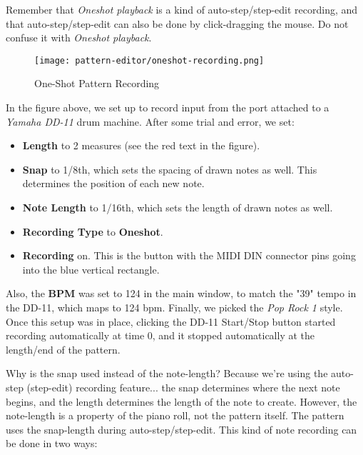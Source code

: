    Remember that \textsl{Oneshot playback} is a kind of auto-step/step-edit
   recording, and that auto-step/step-edit can also be done by click-dragging
   the mouse.  Do not confuse it with \textsl{Oneshot playback}.

\begin{figure}[H]
   \centering 
   \texttt{[image: pattern-editor/oneshot-recording.png]}
   \caption{One-Shot Pattern Recording}
   \label{fig:pattern_editor_oneshot_recording}
\end{figure}

   In the figure above, we set up to record input from the port attached to a
   \textsl{Yamaha DD-11} drum machine.  After some trial and error,
   we set:

   \begin{itemize}
      \item \textbf{Length} to 2 measures (see the red text in the figure).
      \item \textbf{Snap} to 1/8th, which sets the spacing of drawn notes as
         well.  This determines the position of each new note.
      \item \textbf{Note Length} to 1/16th, which sets the length of drawn
         notes as well.
      \item \textbf{Recording Type} to \textbf{Oneshot}.
      \item \textbf{Recording} on. This is the button with the MIDI DIN
         connector pins going into the blue vertical rectangle.
   \end{itemize}

   Also, the \textbf{BPM} was set to 124 in the main
   window, to match the "39" tempo in the DD-11, which maps to 124 bpm.
   Finally, we picked the \textsl{Pop Rock 1} style.  
   Once this setup was in place, clicking the DD-11 Start/Stop button started
   recording automatically at time 0, and it stopped automatically at the
   length/end of the pattern.

   Why is the snap used instead of the note-length?  Because we're using the
   auto-step (step-edit) recording feature...
   the snap determines where the next note
   begins, and the length determines the length of the note to create.
   However, the note-length is a property of the piano roll, not the pattern
   itself.  The pattern uses the snap-length during auto-step/step-edit.
   This kind of note recording can be done in two ways:

